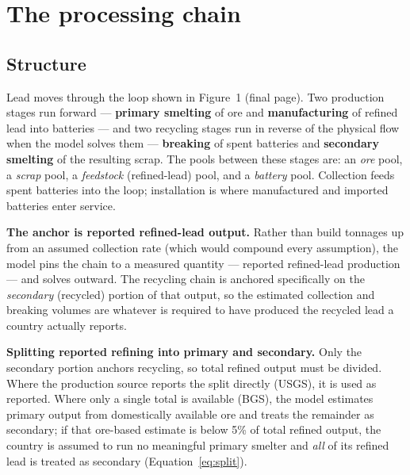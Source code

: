 \documentclass[11pt,a4paper]{article}
\begin{document}
\section{The processing chain}

\subsection{Structure}

Lead moves through the loop shown in Figure~1 (final page). Two
production stages run forward --- \textbf{primary smelting} of ore and
\textbf{manufacturing} of refined lead into batteries --- and two recycling stages run
in reverse of the physical flow when the model solves them --- \textbf{breaking} of
spent batteries and \textbf{secondary smelting} of the resulting scrap. The pools
between these stages are: an \emph{ore} pool, a \emph{scrap} pool, a \emph{feedstock}
(refined-lead) pool, and a \emph{battery} pool. Collection feeds spent batteries into
the loop; installation is where manufactured and imported batteries enter service.

\begin{decision}
\textbf{The anchor is reported refined-lead output.} Rather than build tonnages up
from an assumed collection rate (which would compound every assumption), the model
pins the chain to a measured quantity --- reported refined-lead production --- and
solves outward. The recycling chain is anchored specifically on the \emph{secondary}
(recycled) portion of that output, so the estimated collection and breaking volumes are
whatever is required to have produced the recycled lead a country actually reports.
\end{decision}

\begin{decision}
\textbf{Splitting reported refining into primary and secondary.} Only the secondary
portion anchors recycling, so total refined output must be divided. Where the
production source reports the split directly (USGS), it is used as reported. Where only
a single total is available (BGS), the model estimates primary output from domestically
available ore and treats the remainder as secondary; if that ore-based estimate is
below 5\% of total refined output, the country is assumed to run no meaningful primary
smelter and \emph{all} of its refined lead is treated as secondary
(Equation~\ref{eq:split}).
\end{decision}
\end{document}
